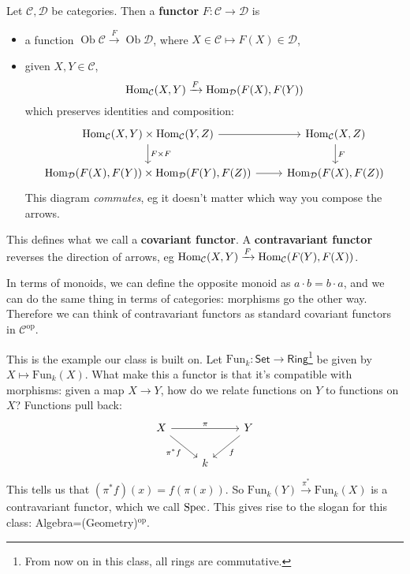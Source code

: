\begin{definition}[]
    Let $\mathcal{C} ,\mathcal{D} $ be categories. Then a \textbf{functor} $F \colon \mathcal{C}  \to \mathcal{D}  $ is 
    \begin{itemize}
    \setlength\itemsep{-.2em}
        \item 
    a function $\operatorname{Ob}\mathcal{C} \xrightarrow{F}  \operatorname{Ob}\mathcal{D} $, where $X \in \mathcal{C} \mapsto  F(X) \in \mathcal{D} $,
\item given $X,Y \in \mathcal{C} $, \[
        \operatorname{Hom} _{\mathcal{C} }(X,Y) \xrightarrow{F} \operatorname{Hom} _{\mathcal{D} }(F(X),F(Y))
\] which preserves identities and composition: \[
\begin{tikzcd}
{\Hom_{\mathcal C}(X , Y)\times \Hom_{\mathcal C}(Y,Z)} \arrow[r] \arrow[d, "F\times F"] & {\Hom_{\mathcal C}(X,Z)} \arrow[d, "F"] \\
{\Hom_{\mathcal D}(F(X) , F(Y))\times \Hom_{\mathcal D}(F(Y),F(Z))} \arrow[r]            & {\Hom_{\mathcal D}(F(X),F(Z))}         
\end{tikzcd}
\] This diagram \emph{commutes}, eg it doesn't matter which way you compose the arrows.
    \end{itemize}
    This defines what we call a \textbf{covariant functor}. A \textbf{contravariant functor} reverses the direction of arrows, eg $\operatorname{Hom} _{\mathcal{C} }(X,Y) \xrightarrow{F} \operatorname{Hom} _{\mathcal{C} }(F(Y),F(X))$. 
\end{definition} 
In terms of monoids, we can define the opposite monoid as $a \cdot b=b\cdot a$, and we can do the same thing in terms of categories: morphisms go the other way. Therefore we can think of contravariant functors as standard covariant functors in $\mathcal{C} ^{\mathrm{op}}$.
\begin{example}[Functions]
    This is the example our class is built on. Let $\mathrm{Fun}_k \colon \mathsf{Set}  \to \mathsf{Ring} $\footnote{From now on in this class, all rings are commutative.} be given by $X \mapsto \mathrm{Fun}_k(X)$. What make this a functor is that it's compatible with morphisms: given a map $X \to Y$, how do we relate functions on $Y$ to functions on $X$? Functions pull back: 
\[
\begin{tikzcd}
X \arrow[rr, "\pi"] \arrow[rd, "\pi^*f"'] &   & Y \arrow[ld, "f"] \\
                                          & k &                  
\end{tikzcd}
\] 
This tells us that $(\pi^*f)(x)=f(\pi(x))$. So $\mathrm{Fun}_k(Y) \xrightarrow{\pi^*} \mathrm{Fun} _k(X)$ is a contravariant functor, which we call $\operatorname{Spec}$. This gives rise to the slogan for this class: Algebra=(Geometry)$^{\mathrm{op}}$.
\end{example}



